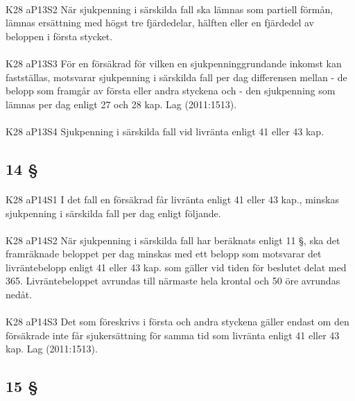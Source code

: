 \documentclass[a4paper,notitlepage,openany,10pt]{book}
\begin{document}
\paragraph*{}
{\tiny K28 aP13S2}
När sjukpenning i särskilda fall ska lämnas som partiell förmån, lämnas ersättning med högst tre fjärdedelar, hälften eller en fjärdedel av beloppen i första stycket.
\paragraph*{}
{\tiny K28 aP13S3}
För en försäkrad för vilken en sjukpenninggrundande inkomst kan fastställas, motsvarar sjukpenning i särskilda fall per dag differensen mellan
\newline - de belopp som framgår av första eller andra styckena och
\newline - den sjukpenning som lämnas per dag enligt 27 och 28 kap.
Lag (2011:1513).
\paragraph*{}
{\tiny K28 aP13S4}
Sjukpenning i särskilda fall vid livränta enligt 41 eller 43 kap.
\subsection*{14 §}
\paragraph*{}
{\tiny K28 aP14S1}
I det fall en försäkrad får livränta enligt 41 eller 43 kap., minskas sjukpenning i särskilda fall per dag enligt följande.
\paragraph*{}
{\tiny K28 aP14S2}
När sjukpenning i särskilda fall har beräknats enligt 11 §, ska det framräknade beloppet per dag minskas med ett belopp som motsvarar det livräntebelopp enligt 41 eller 43 kap. som gäller vid tiden för beslutet delat med 365. Livräntebeloppet avrundas till närmaste hela krontal och 50 öre avrundas nedåt.
\paragraph*{}
{\tiny K28 aP14S3}
Det som föreskrivs i första och andra styckena gäller endast om den försäkrade inte får sjukersättning för samma tid som livränta enligt 41 eller 43 kap.
Lag (2011:1513).
\subsection*{15 §}
\end{document}
